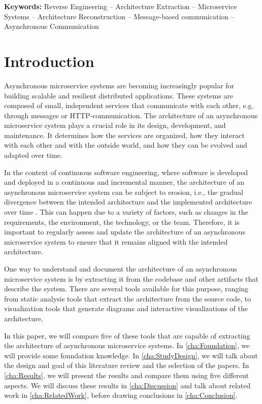 
\textbf{Keywords:} Reverse Engineering -- Architecture Extraction -- Microservice Systems -- Architecture Reconstruction -- Message-based communication -- Asynchronous Communication

\section{Introduction}
\label{cha:Introduction}
Asynchronous microservice systems are becoming increasingly popular for building scalable and resilient distributed applications.
These systems are composed of small, independent services that communicate with each other, e.g. through messages or HTTP-communication.
The architecture of an asynchronous microservice system plays a crucial role in its design, development, and maintenance.
It determines how the services are organized, how they interact with each other and with the outside world, and how they can be evolved and adapted over time.

In the context of continuous software engineering, where software is developed and deployed in a continuous and incremental manner, the architecture of an asynchronous microservice system can be subject to erosion, i.e., the gradual divergence between the intended architecture and the implemented architecture over time \cite{DESILVA2012132}.
This can happen due to a variety of factors, such as changes in the requirements, the environment, the technology, or the team.
Therefore, it is important to regularly assess and update the architecture of an asynchronous microservice system to ensure that it remains aligned with the intended architecture.

One way to understand and document the architecture of an asynchronous microservice system is by extracting it from the codebase and other artifacts that describe the system.
There are several tools available for this purpose, ranging from static analysis tools that extract the architecture from the source code, to visualization tools that generate diagrams and interactive visualizations of the architecture.

In this paper, we will compare five of these tools that are capable of extracting the architecture of asynchronous microservice systems.
In \autoref{cha:Foundation}, we will provide some foundation knowledge.
In \autoref{cha:StudyDesign}, we will talk about the design and goal of this literature review and the selection of the papers.
In \autoref{cha:Results}, we will present the results and compare them using five different aspects.
We will discuss these results in \autoref{cha:Discussion} and talk about related work in \autoref{cha:RelatedWork}, before drawing conclusions in \autoref{cha:Conclusion}.

